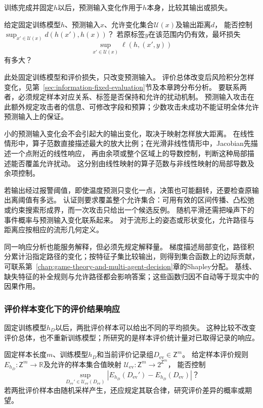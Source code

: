 训练完成并固定$h$以后，预测输入变化作用于$h$本身，比较其输出或损失。

\begin{mathproblem}[预测输入扰动的输出与损失响应]
  \label{question:future-robustness}
  给定固定训练模型$h$、预测输入$x$、允许变化集合$\mathcal U(x)$及输出距离$d$，
  能否控制$\sup_{x'\in\mathcal U(x)}d(h(x'),h(x))$？
  若原标签$y$在该范围内仍有效，最坏损失
  \[
    \sup_{x'\in\mathcal U(x)}\ell(h,(x',y))
  \]
  有多大？
\end{mathproblem}

此处固定训练模型和评价损失，只改变预测输入。
评价总体改变后风险积分怎样变化，见第~\ref{sec:information-fixed-evaluation}节及本章跨分布分析。
要联系两者，必须规定样本对应关系、标签是否保持和允许的扰动机制。
预测输入攻击在此额外规定攻击者的信息、可修改字段和预算；少数攻击未成功不能证明全体允许预测输入上的保证。

小的预测输入变化会不会引起大的输出变化，取决于映射怎样放大距离。
在线性情形中，算子范数直接描述最大的放大比例；在光滑非线性情形中，Jacobian先描述一个点附近的线性响应，
再由余项或整个区域上的导数控制，判断这种局部描述能否覆盖允许扰动。
这分别由线性映射的算子范数与非线性映射的局部导数及余项控制。

若输出经过报警阈值，即使温度预测只变化一点，决策也可能翻转，还要检查原输出离阈值有多远。
认证则要求覆盖整个允许集合：可用有效的区间传播、凸松弛或约束搜索形成界，而一次攻击只给出一个候选反例。
随机平滑还需把噪声下的事件概率与预测输入变化联系起来。
对于流形上的姿态或形状变化，允许路径与距离应按相应的流形几何定义。

同一响应分析也能服务解释，但必须先规定解释量。
梯度描述局部变化，路径积分累计沿指定路径的变化；按特征子集比较输出，则得到集合函数上的边际贡献，
可联系第~\ref{chap:game-theory-and-multi-agent-decision}章的Shapley分配。
基线、缺失特征的补全规则与允许路径都会影响答案；这些函数归因不自动等于现实中的因果作用。

\subsubsection{评价样本变化下的评价结果响应}
\label{sec:future-analysis-evaluation-sample-response}

固定训练模型$h_D$以后，两批评价样本可以给出不同的平均损失。
这种比较不改变评价总体，也不重新训练模型；所研究的是样本评价统计量对已取得记录的响应。

\begin{mathproblem}[评价样本变换造成的评价差异]
  \label{question:future-evaluation-sample-response}
  固定样本长度$m$、训练模型$h_D$和当前评价记录组$D_{\mathrm{ev}}\in\mathsf Z^m$。
  给定样本评价规则$E_{h_D}:\mathsf Z^m\to\mathbb R$及允许的样本集合值映射
  $\mathcal U_{\mathrm{ev}}:\mathsf Z^m\to2^{\mathsf Z^m}$，
  能否控制
  \[
    \sup_{D_{\mathrm{ev}}'\in\mathcal U_{\mathrm{ev}}(D_{\mathrm{ev}})}
      |E_{h_D}(D_{\mathrm{ev}}')-E_{h_D}(D_{\mathrm{ev}})|\text{？}
  \]
  若两批评价样本由随机采样产生，还应规定其联合律，研究评价差异的概率或期望。
\end{mathproblem}

